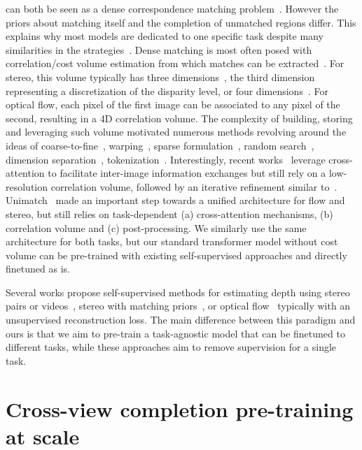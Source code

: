 \documentclass[10pt,twocolumn,letterpaper]{article}
\newcommand{\para}[1]{\noindent{\bf{#1}}}
\begin{document}
\para{Stereo matching and optical flow} can both be seen as a dense correspondence matching problem~\cite{unimatch}. However the priors about matching itself and the completion of unmatched regions differ. This explains why most models are dedicated to one specific task despite many similarities in the strategies~\cite{laga2020survey,zhaisurvey21}.
Dense matching is most often posed with correlation/cost volume estimation from which matches can be extracted~\cite{flownet,sceneflow}.
For stereo, this volume typically has three dimensions~\cite{jie2018left,stereonet,yin2019hierarchical}, the third dimension representing a discretization of the disparity level, or four dimensions~\cite{psmnet,gcnet,nie2019multi}. 
For optical flow, each pixel of the first image can be associated to any pixel of the second, resulting in a 4D correlation volume. The complexity of building, storing and leveraging such volume motivated numerous methods revolving around the ideas of coarse-to-fine~\cite{deqflow,raft,gmflownet}, warping~\cite{pwcnetplus}, sparse formulation~\cite{jiang21}, random search~\cite{dip}, dimension separation~\cite{sepflow}, tokenization~\cite{flowformer}. 
Interestingly, recent  works~\cite{craft,gmflow,unimatch} leverage cross-attention to facilitate inter-image information exchanges but still rely on a low-resolution correlation volume, followed by an iterative refinement similar to~\cite{raft}. 
Unimatch~\cite{unimatch} made an important step towards a unified architecture for flow and stereo, but still relies on task-dependent (a) cross-attention mechanisms, (b) correlation volume and (c) post-processing. 
We similarly use the same architecture for both tasks, but our standard transformer model without cost volume can be pre-trained with existing self-supervised approaches and directly finetuned as is.

Several works propose self-supervised methods for estimating depth using stereo pairs or videos~\cite{godard2017unsupervised,godard2019digging}, stereo with matching priors~\cite{zhou2017unsupervised}, or optical flow~\cite{sun2014quantitative,selflow,yu2016back} typically with an unsupervised reconstruction loss. The main difference between this paradigm and ours is that we aim to pre-train a task-agnostic model that can be finetuned to different tasks, while these approaches aim to remove supervision for a single task.


\section{Cross-view completion pre-training at scale}
\label{sec:method}
\end{document}
